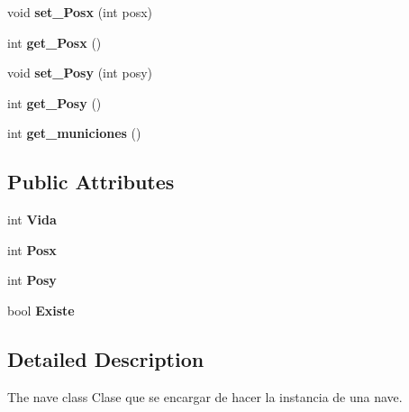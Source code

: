 \begin{DoxyCompactItemize}
\item 
\hypertarget{classnave_a1ebb327d302fd2f7aed03363d608b381}{void {\bfseries set\+\_\+\+Posx} (int posx)}\label{classnave_a1ebb327d302fd2f7aed03363d608b381}

\item 
\hypertarget{classnave_a2ee2f19620899f3a104c5e5fd53f11b8}{int {\bfseries get\+\_\+\+Posx} ()}\label{classnave_a2ee2f19620899f3a104c5e5fd53f11b8}

\item 
\hypertarget{classnave_a4a93e87a592eefa3cac14155a61f9829}{void {\bfseries set\+\_\+\+Posy} (int posy)}\label{classnave_a4a93e87a592eefa3cac14155a61f9829}

\item 
\hypertarget{classnave_ae97a448e15092f85e1f83d36c9078809}{int {\bfseries get\+\_\+\+Posy} ()}\label{classnave_ae97a448e15092f85e1f83d36c9078809}

\item 
\hypertarget{classnave_a109542f61e18bf2633b519e3da267c83}{int {\bfseries get\+\_\+municiones} ()}\label{classnave_a109542f61e18bf2633b519e3da267c83}

\end{DoxyCompactItemize}
\subsection*{Public Attributes}
\begin{DoxyCompactItemize}
\item 
\hypertarget{classnave_a216fab5dcc693394b3252add08629039}{int {\bfseries Vida}}\label{classnave_a216fab5dcc693394b3252add08629039}

\item 
\hypertarget{classnave_ac9ba49b3d59e902240698405a8529566}{int {\bfseries Posx}}\label{classnave_ac9ba49b3d59e902240698405a8529566}

\item 
\hypertarget{classnave_a39a3d2114d0de42b8c88690a35c58cb5}{int {\bfseries Posy}}\label{classnave_a39a3d2114d0de42b8c88690a35c58cb5}

\item 
\hypertarget{classnave_a5c214e33590287d4449109c817310647}{bool {\bfseries Existe}}\label{classnave_a5c214e33590287d4449109c817310647}

\end{DoxyCompactItemize}


\subsection{Detailed Description}
The nave class Clase que se encargar de hacer la instancia de una nave. 


